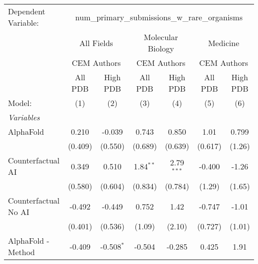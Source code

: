 \begingroup
\centering
\begin{tabular}{lcccccc}
   \tabularnewline \midrule \midrule
   Dependent Variable: & \multicolumn{6}{c}{num\_primary\_submissions\_w\_rare\_organisms}\\
 & \multicolumn{2}{c}{All Fields} & \multicolumn{2}{c}{Molecular Biology} & \multicolumn{2}{c}{Medicine} \\
\cmidrule(lr){2-3} \cmidrule(lr){4-5} \cmidrule(lr){6-7}
 & \multicolumn{2}{c}{CEM Authors} & \multicolumn{2}{c}{CEM Authors} & \multicolumn{2}{c}{CEM Authors} \\
\cmidrule(lr){2-3} \cmidrule(lr){4-5} \cmidrule(lr){6-7}
 & \multicolumn{1}{c}{All PDB} & \multicolumn{1}{c}{High PDB} & \multicolumn{1}{c}{All PDB} & \multicolumn{1}{c}{High PDB} & \multicolumn{1}{c}{All PDB} & \multicolumn{1}{c}{High PDB} \\
\cmidrule(lr){2-2} \cmidrule(lr){3-3} \cmidrule(lr){4-4} \cmidrule(lr){5-5} \cmidrule(lr){6-6} \cmidrule(lr){7-7}
   Model:                                                     & (1)          & (2)           & (3)           & (4)           & (5)          & (6)\\  
   \midrule
   \emph{Variables}\\
   AlphaFold                                                  & 0.210        & -0.039        & 0.743         & 0.850         & 1.01         & 0.799\\   
                                                              & (0.409)      & (0.550)       & (0.689)       & (0.639)       & (0.617)      & (1.26)\\   
   Counterfactual AI                                          & 0.349        & 0.510         & 1.84$^{**}$   & 2.79$^{***}$  & -0.400       & -1.26\\   
                                                              & (0.580)      & (0.604)       & (0.834)       & (0.784)       & (1.29)       & (1.65)\\   
   Counterfactual No AI                                       & -0.492       & -0.449        & 0.752         & 1.42          & -0.747       & -1.01\\   
                                                              & (0.401)      & (0.536)       & (1.09)        & (2.10)        & (0.727)      & (1.01)\\   
   AlphaFold - Method                                         & -0.409       & -0.508$^{*}$  & -0.504        & -0.285        & 0.425        & 1.91\\   

\end{tabular}
